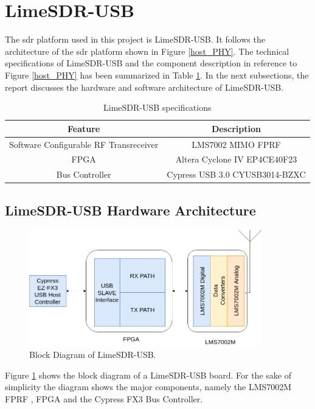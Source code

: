 \section{LimeSDR-USB}
The \ac{sdr} platform used in this project is LimeSDR-USB.
It follows the architecture of the \ac{sdr} platform shown in Figure \ref{host_PHY}.
The technical specifications of LimeSDR-USB and the component description in reference to Figure \ref{host_PHY} has been summarized in Table \ref{specs}.
In the next subsections, the report discusses the hardware and software architecture of LimeSDR-USB.


\begin{table}[h!]
\centering
\begin{tabular}{|c|c|}
\hline
Feature & Description\\
\hline
Software Configurable RF Transreceiver & LMS7002 MIMO FPRF\\
\ac{FPGA} & Altera Cyclone IV EP4CE40F23 \\
Bus Controller & Cypress USB 3.0 CYUSB3014-BZXC\\

\hline
\end{tabular}
\caption{LimeSDR-USB specifications}
\label{specs}
\end{table}

\subsection{LimeSDR-USB Hardware Architecture}

\begin{figure}[h!]
\centering
\includegraphics[width=0.9\textwidth]{Figure/Lime_Hardware.png}
\caption{Block Diagram of LimeSDR-USB.}
\label{lime_hw_arch}
\end{figure}

Figure \ref{lime_hw_arch} shows the block diagram of a LimeSDR-USB board.
For the sake of simplicity the diagram shows the major components, namely the LMS7002M \ac{FPRF} \cite{noauthor_lms7002m_nodate}, \ac{FPGA} and the Cypress FX3 Bus Controller.

